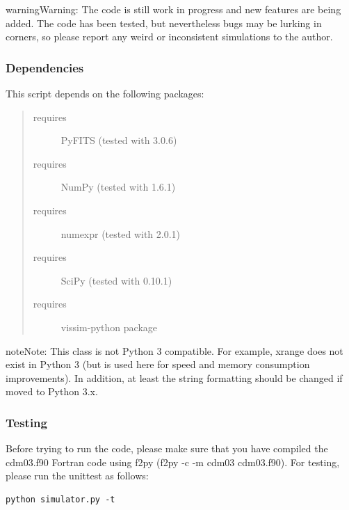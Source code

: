 \documentclass[a4paper,11pt,english]{sphinxmanual}
\begin{document}
\begin{notice}{warning}{Warning:}
The code is still work in progress and new features are being added.
The code has been tested, but nevertheless bugs may be lurking in corners, so
please report any weird or inconsistent simulations to the author.
\end{notice}


\subsubsection{Dependencies}
\label{simulator:dependencies}
This script depends on the following packages:
\begin{quote}\begin{description}
\item[{requires}] \leavevmode
PyFITS (tested with 3.0.6)

\item[{requires}] \leavevmode
NumPy (tested with 1.6.1)

\item[{requires}] \leavevmode
numexpr (tested with 2.0.1)

\item[{requires}] \leavevmode
SciPy (tested with 0.10.1)

\item[{requires}] \leavevmode
vissim-python package

\end{description}\end{quote}

\begin{notice}{note}{Note:}
This class is not Python 3 compatible. For example, xrange does not exist
in Python 3 (but is used here for speed and memory consumption improvements).
In addition, at least the string formatting should be changed if moved to
Python 3.x.
\end{notice}


\subsubsection{Testing}
\label{simulator:testing}
Before trying to run the code, please make sure that you have compiled the
cdm03.f90 Fortran code using f2py (f2py -c -m cdm03 cdm03.f90). For testing,
please run the unittest as follows:

\begin{Verbatim}[commandchars=\\\{\}]
python simulator.py -t
\end{Verbatim}
\end{document}
